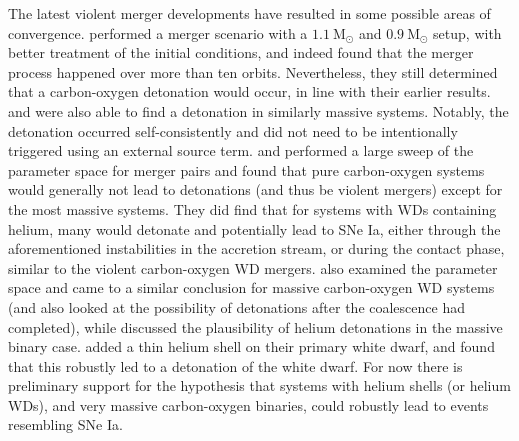 \documentclass[iop,numberedappendix]{../emulateapj}
\newcommand{\msolar}{\mathrm{M}_\odot}
\begin{document}
The latest violent merger developments have resulted in some possible areas of convergence.
\cite{pakmor:2012} performed a merger scenario
with a $1.1\ \msolar$ and $0.9\ \msolar$ setup, with better treatment
of the initial conditions, and indeed found that the merger process
happened over more than ten orbits. Nevertheless, they still determined
that a carbon-oxygen detonation would occur, in line with their
earlier results. \cite{moll:2014} and \cite{kashyap:2015} were also 
able to find a detonation in similarly massive systems. Notably,
the detonation occurred self-consistently and did not need to be  
intentionally triggered using an external source term.
\cite{dan:2012} and \cite{dan:2014} performed a large sweep 
of the parameter space for merger pairs and
found that pure carbon-oxygen systems would generally not lead to
detonations (and thus be violent mergers) except for the most massive
systems. They did find that for systems with WDs containing helium, many
would detonate and potentially lead to SNe Ia, either through the
aforementioned instabilities in the accretion stream, or during the
contact phase, similar to the violent carbon-oxygen WD
mergers. \cite{sato:2015} also examined the parameter space and
came to a similar conclusion for massive carbon-oxygen WD systems
(and also looked at the possibility of detonations after the
coalescence had completed), while \cite{tanikawa:2015} discussed
the plausibility of helium detonations in the massive binary case.
\cite{pakmor:2013} added a thin helium shell on their primary
white dwarf, and found that this robustly led to a detonation of the
white dwarf. For now there is preliminary support for the hypothesis
that systems with helium shells (or helium WDs), and very massive carbon-oxygen binaries,
could robustly lead to events resembling SNe Ia.
\end{document}
